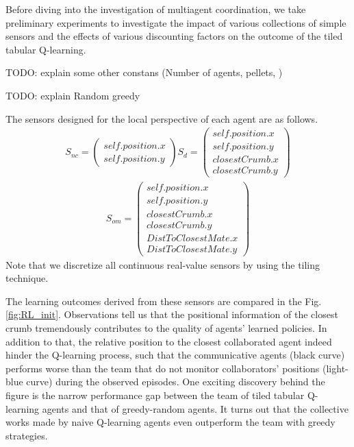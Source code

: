 \documentclass[conference]{IEEEtran}
\begin{document}
Before diving into the investigation of multiagent coordination, we take 
preliminary experiments to investigate the impact of various collections of
simple sensors and the effects of various discounting factors on the outcome
of the tiled tabular Q-learning.

TODO: explain some other constans (Number of agents, pellets, )

TODO: explain Random greedy

The sensors designed for the local perspective of each agent are as follows. 
\begin{align}
    S_{nc} = \left( \begin{array}{c}
      self.position.x \\
      self.position.y 
  \end{array} \right)
    S_{d} = \left( \begin{array}{c}
      self.position.x \\
      self.position.y \\
      closestCrumb.x \\
      closestCrumb.y 
  \end{array} \right)
    \nonumber
\end{align}
\begin{align}
        S_{om} = \left( \begin{array}{c}
      self.position.x \\
      self.position.y \\
      closestCrumb.x \\
      closestCrumb.y  \\
      DistToClosestMate.x \\
      DistToClosestMate.y 
  \end{array} \right)
        \nonumber
\end{align}
Note that we discretize all continuous real-value sensors by using the tiling
technique. 

The learning outcomes derived from these sensors are compared in the
Fig. \ref{fig:RL_init}. 
Observations tell us that the positional information of the closest crumb
tremendously contributes to the quality of agents' learned policies. 
In addition to that, the relative position to the closest collaborated agent
indeed hinder the Q-learning process, such that the communicative agents (black
curve) performs worse than the team that do not monitor collaborators'
positions (light-blue curve) during the observed episodes. One exciting
discovery behind the figure is the narrow performance gap between the team of
tiled tabular Q-learning agents and that of greedy-random agents. It turns out
that the collective works made by naive Q-learning agents even outperform the
team with greedy strategies.
\end{document}
